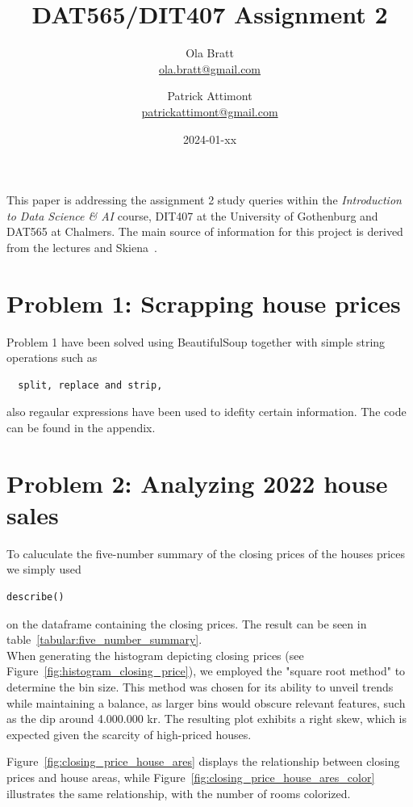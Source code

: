 \documentclass[a4paper]{article}
\begin{document}
\author{Ola Bratt \\
  \href{mailto:ola.bratt@gmail.com}{ola.bratt@gmail.com}
  \and
  Patrick Attimont \\
  \href{patrickattimont@gmail.com}{patrickattimont@gmail.com}
}

\title{DAT565/DIT407 Assignment 2}
\date{2024-01-xx}

\maketitle

This paper is addressing the assignment 2 study queries within the \emph{Introduction to Data Science \& AI} course, DIT407 at 
the University of Gothenburg and DAT565 at Chalmers. The main source of information for this project
is derived from the lectures and Skiena~\cite{Skiena:2024}. 
\section*{Problem 1: Scrapping house prices}
Problem 1 have been solved using BeautifulSoup together with simple string operations such as 
\begin{verbatim}
  split, replace and strip, 
\end{verbatim}
also regaular expressions have been used to idefity certain information. The code can be found in the appendix.

\section*{Problem 2: Analyzing 2022 house sales}
To caluculate the five-number summary of the closing prices of the houses prices we simply used 
\begin{verbatim}
describe()
\end{verbatim}
on the dataframe containing the closing prices. The result can be seen in table~\ref{tabular:five_number_summary}.\\

When generating the histogram depicting closing prices (see Figure~\ref{fig:histogram_closing_price}), we employed the "square root method" to determine the bin size. This method was chosen for its ability to unveil trends while maintaining a balance, as larger bins would obscure relevant features, such as the dip around 4.000.000 kr. The resulting plot exhibits a right skew, which is expected given the scarcity of high-priced houses.

Figure~\ref{fig:closing_price_house_ares} displays the relationship between closing prices and house areas, while Figure~\ref{fig:closing_price_house_ares_color} illustrates the same relationship, with the number of rooms colorized.
\end{document}
